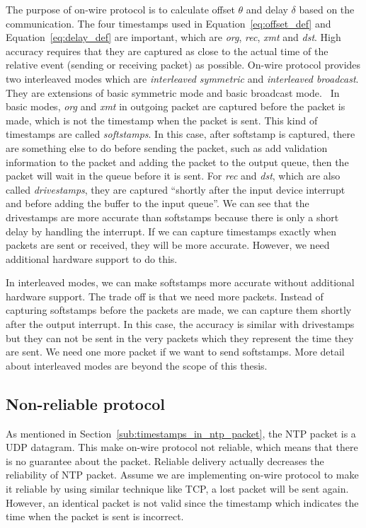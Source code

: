 The purpose of on-wire protocol is to calculate offset $\theta$ and delay
$\delta$ based on the communication. The four timestamps used in
Equation~\ref{eq:offset_def} and Equation~\ref{eq:delay_def} are important,
which are \emph{org}, \emph{rec}, \emph{xmt} and \emph{dst}.
High accuracy requires that they are captured as close to the actual time of
the relative event (sending or receiving packet) as possible. On-wire protocol
provides two interleaved modes which are \emph{interleaved symmetric} and
\emph{interleaved broadcast}. They are extensions of basic symmetric mode and
basic broadcast mode.~\cite{on_wire} 
%
In basic modes, \emph{org} and \emph{xmt} in outgoing packet are captured
before the packet is made, which is not the timestamp when the packet is sent. 
This kind of timestamps are called \emph{softstamps}. In this case, 
after softstamp is captured, there are something else to do before sending the
packet, such as add validation information to the packet and adding the packet
to the output queue, then the packet will wait in the queue before it is sent.
For \emph{rec} and \emph{dst}, which are also called \emph{drivestamps}, they
are captured ``shortly after the input device interrupt and before adding the
buffer to the input queue''.\cite{on_wire} We can see that the drivestamps are
more accurate than softstamps because there is only a short delay by handling
the interrupt. If we can capture timestamps exactly when packets are sent or
received, they will be more accurate. However, we need additional hardware
support to do this.

In interleaved modes, we can make softstamps more accurate without
additional hardware support. The trade off is that we need more packets.
Instead of capturing softstamps before the packets are made, we can capture
them shortly after the output interrupt. In this case, the accuracy is similar
with drivestamps but they can not be sent in the very packets which they
represent the time they are sent. We need one more packet if we want to send
softstamps. More detail about interleaved modes are beyond the scope of this
thesis.

\subsection{Non-reliable protocol}%
\label{sub:non_reliable_protocol}
As mentioned in Section~\ref{sub:timestamps_in_ntp_packet}, the NTP packet is a
UDP datagram. This make on-wire protocol not reliable, which means that there
is no guarantee about the packet. Reliable delivery actually decreases the
reliability of NTP packet. Assume we are implementing on-wire protocol to make
it reliable by using similar technique like TCP, a lost packet will be sent
again. However, an identical packet is not valid since the timestamp which
indicates the time when the packet is sent is incorrect.

